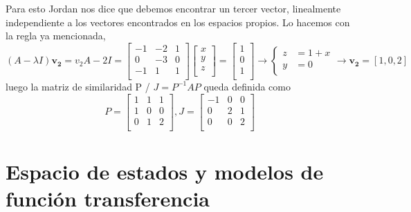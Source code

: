 \begin{example}
    Para esto Jordan nos dice que debemos encontrar un tercer vector, linealmente independiente a los vectores encontrados
    en los espacios propios. Lo hacemos con la regla ya mencionada, 
    \begin{equation*}
        (A-\lambda I)\bm{v_2} = v_2
        A - 2I = 
        \begin{bmatrix}
        -1 & -2 & 1\\
        0 & -3 & 0\\
        -1 & 1 & 1\\
        \end{bmatrix}
        \begin{bmatrix}
        x \\
        y\\
        z\\
        \end{bmatrix} = 
        \begin{bmatrix}
            1\\
            0\\
            1\\
        \end{bmatrix}
        \rightarrow 
        \begin{cases}
            z &= 1+x \\
            y &= 0 \\
        \end{cases}
        \rightarrow
        \bm{v_2} = [1, 0, 2]
    \end{equation*}
    luego la matriz de similaridad P / $ J = P^{-1} A P$ queda definida como
    \begin{equation*}
        P = \begin{bmatrix}
        1 & 1 & 1\\
        1 & 0 & 0\\
        0 & 1 & 2\\
        \end{bmatrix}%
        , J = \begin{bmatrix}
        -1 & 0 & 0\\
        0 & 2 & 1\\
        0 & 0 & 2\\
        \end{bmatrix}
    \end{equation*}

\end{example}

\newpage
\section{Espacio de estados y modelos de función transferencia}

